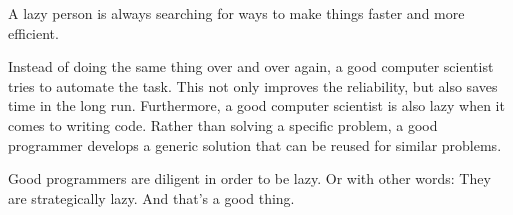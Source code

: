 
A lazy person is always searching for ways to make things faster and more efficient.

Instead of doing the same thing over and over again, a good computer scientist tries to automate the task. This not only improves the reliability, but also saves time in the long run. Furthermore, a good computer scientist is also lazy when it comes to writing code. Rather than solving a specific problem, a good programmer develops a generic solution that can be reused for similar problems.

Good programmers are diligent in order to be lazy. Or with other words: They are strategically lazy. And that's a good thing.

